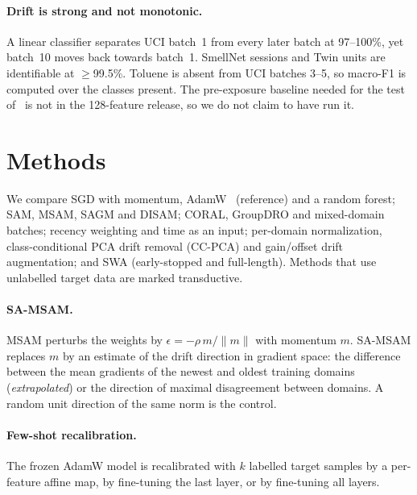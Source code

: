 \documentclass[10pt,twocolumn,letterpaper]{article}
\begin{document}
\paragraph{Drift is strong and not monotonic.} A linear classifier separates UCI batch~1 from every later batch at
97--100\%, yet batch~10 moves back towards batch~1. SmellNet sessions and Twin units are identifiable at
$\geq$99.5\%. Toluene is absent from UCI batches 3--5, so macro-F1 is computed over the classes present. The
pre-exposure baseline needed for the test of~\cite{dennler2022drift} is not in the 128-feature release, so we do
not claim to have run it.

\section{Methods}
\label{sec:methods}
We compare SGD with momentum, AdamW~\cite{loshchilov2019adamw} (reference) and a random forest; SAM, MSAM, SAGM and
DISAM; CORAL, GroupDRO and mixed-domain batches; recency weighting and time as an input; per-domain normalization,
class-conditional PCA drift removal (CC-PCA) and gain/offset drift augmentation; and SWA (early-stopped and
full-length). Methods that use unlabelled target data are marked transductive.

\paragraph{SA-MSAM.} MSAM perturbs the weights by $\epsilon = -\rho\, m/\lVert m\rVert$ with momentum $m$.
SA-MSAM replaces $m$ by an estimate of the drift direction in gradient space: the difference between the mean
gradients of the newest and oldest training domains (\emph{extrapolated}) or the direction of maximal disagreement
between domains. A random unit direction of the same norm is the control.

\paragraph{Few-shot recalibration.} The frozen AdamW model is recalibrated with $k$ labelled target samples by a
per-feature affine map, by fine-tuning the last layer, or by fine-tuning all layers.
\end{document}
